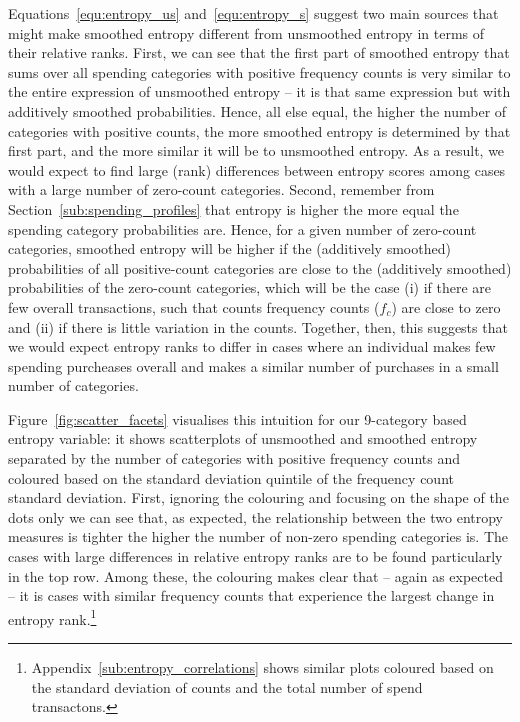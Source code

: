 Equations~\ref{equ:entropy_us} and~\ref{equ:entropy_s} suggest two main sources
that might make smoothed entropy different from unsmoothed entropy in terms of
their relative ranks. First, we can see that the first part of smoothed entropy
that sums over all spending categories with positive frequency counts is very
similar to the entire expression of unsmoothed entropy -- it is that same
expression but with additively smoothed probabilities. Hence, all else equal,
the higher the number of categories with positive counts, the more smoothed
entropy is determined by that first part, and the more similar it will be to
unsmoothed entropy. As a result, we would expect to find large (rank)
differences between entropy scores among cases with a large number of
zero-count categories. Second, remember from
Section~\ref{sub:spending_profiles} that entropy is higher the more equal the
spending category probabilities are. Hence, for a given number of zero-count
categories, smoothed entropy will be higher if the (additively smoothed)
probabilities of all positive-count categories are close to the (additively
smoothed) probabilities of the zero-count categories, which will be the case
(i) if there are few overall transactions, such that counts frequency counts
($f_c$) are close to zero and (ii) if there is little variation in the counts.
Together, then, this suggests that we would expect entropy ranks to differ in
cases where an individual makes few spending purcheases overall and makes a similar
number of purchases in a small number of categories.

Figure~\ref{fig:scatter_facets} visualises this intuition for our 9-category
based entropy variable: it shows scatterplots of unsmoothed and smoothed
entropy separated by the number of categories with positive frequency counts
and coloured based on the standard deviation quintile of the frequency count
standard deviation. First, ignoring the colouring and focusing on the shape of
the dots only we can see that, as expected, the relationship between the two
entropy measures is tighter the higher the number of non-zero spending
categories is. The cases with large differences in relative entropy ranks are
to be found particularly in the top row. Among these, the colouring makes clear
that -- again as expected -- it is cases with similar frequency counts that
experience the largest change in entropy
rank.\footnote{Appendix~\ref{sub:entropy_correlations} shows similar plots
    coloured based on the standard deviation of counts and the total number of
    spend transactons.}

